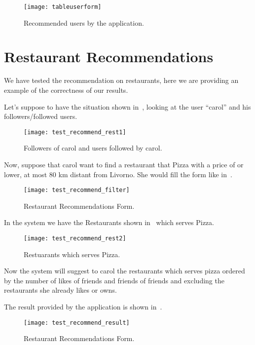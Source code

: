 \begin{figure}[htb]
	\centering
	\texttt{[image: tableuserform]}
	\caption{Recommended users by the application.}\label{fig:tableuserform}
\end{figure}

\section{Restaurant Recommendations}

We have tested the recommendation on restaurants, here we are providing an
example of the correctness of our results.

Let's suppose to have the situation shown in~, looking
at the user ``carol'' and his followers/followed users.

\begin{figure}[htb]
	\centering
	\texttt{[image: test\_recommend\_rest1]}
	\caption{Followers of carol and users followed by carol.}\label{fig:recommendres1}
\end{figure}

Now, suppose that carol want to find a restaurant that  Pizza with
a price of  or lower, at most 80 km distant from Livorno. She would
fill the form like in~.

\begin{figure}[H]
	\centering
	\texttt{[image: test\_recommend\_filter]}
	\caption{Restaurant Recommendations Form.}\label{fig:resrecform}
\end{figure}

In the system we have the Restaurants shown in~ which
serves Pizza.

\begin{figure}[htb]
	\centering
	\texttt{[image: test\_recommend\_rest2]}
	\caption{Restuarants which serves Pizza.}\label{fig:recommendres2}
\end{figure}

Now the system will suggest to carol the restaurants which serves pizza ordered
by the number of likes of friends and friends of friends and excluding the
restaurants she already likes or owns.

The result provided by the application is shown in~.

\begin{figure}[H]
	\centering
	\texttt{[image: test\_recommend\_result]}
	\caption{Restaurant Recommendations Form.}\label{fig:recresult}
\end{figure}

